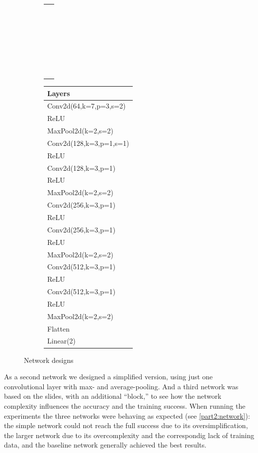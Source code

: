 \documentclass[sigconf,nonacm]{acmart}
\begin{document}
\begin{figure}[ht]
\begin{subfigure}[t]{0.3\columnwidth}
\begin{tabular}{l}
      ~\\
      ~\\
      ~\\
      ~\\
      ~\\
      ~\\
    \end{tabular}
  \end{subfigure}
  \begin{subfigure}[t]{0.3\columnwidth}
    \scriptsize
    \begin{tabular}{l}
      Layers \\
      \hline
      Conv2d(64,k=7,p=3,s=2) \\
      ReLU  \\
      MaxPool2d(k=2,s=2) \\
      Conv2d(128,k=3,p=1,s=1) \\
      ReLU \\
      Conv2d(128,k=3,p=1)  \\
      ReLU \\
      MaxPool2d(k=2,s=2) \\
      Conv2d(256,k=3,p=1) \\
      ReLU \\
      Conv2d(256,k=3,p=1) \\
      ReLU \\
      MaxPool2d(k=2,s=2) \\
      Conv2d(512,k=3,p=1) \\
      ReLU \\
      Conv2d(512,k=3,p=1) \\
      ReLU \\
      MaxPool2d(k=2,s=2) \\
      Flatten \\
      Linear(2) 
    \end{tabular}
  \end{subfigure}
  \label{part2:networks}
\vspace{-.7\baselineskip}
  \caption{Network designs}
\end{figure}


As a second network we designed a simplified version, using
just one convolutional layer with max- and average-pooling.
And a third network was based on the slides, with an
additional ``block,'' to see how the network complexity
influences the accuracy and the training success.
When running the experiments the three networks
were behaving as expected (see \ref{part2:network}): the simple network could not
reach the full success due to its oversimplification,
the larger network due to its overcomplexity and the
correspondig lack of training data,
and the baseline network generally achieved the best
results.
\end{document}
